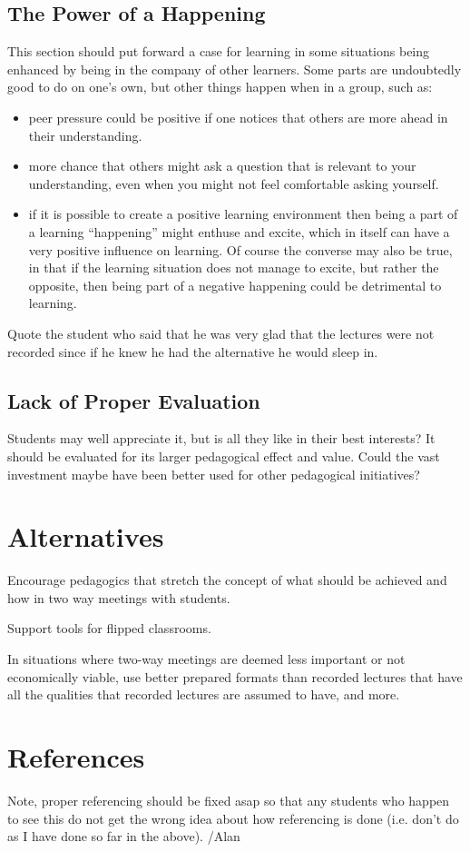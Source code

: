 \documentclass[a4paper,10pt]{article}
\begin{document}
\subsection{The Power of a Happening}
This section should put forward a case for learning in some situations being enhanced by being in the company of other learners. Some parts are undoubtedly good to do on one's own, but other things happen when in a group, such as:
\begin{itemize}
\item  peer pressure could be positive if one notices that others are more ahead in their understanding. 
\item more chance that others might ask a question that is relevant to your understanding, even when you might not feel comfortable asking yourself.
\item if it is possible to create a positive learning environment then being a part of a learning ``happening'' might enthuse and excite, which in itself can have a very positive influence on learning. Of course the converse may also be true, in that if the learning situation does not manage to excite, but rather the opposite, then being part of a negative happening could be detrimental to learning.
\end{itemize}


Quote the student who said that he was very glad that the lectures were not recorded since if he knew he had the alternative he would sleep in. 


\subsection{Lack of Proper Evaluation}
Students may well appreciate it, but is all they like in their best interests? It should be evaluated for its larger pedagogical effect and value.
Could the vast investment maybe have been better used for other pedagogical initiatives?

\section{Alternatives}
Encourage pedagogics that stretch the concept of what should be achieved and how in two way meetings with students.

Support tools for flipped classrooms.

In situations where two-way meetings are deemed less important or not economically viable, use better prepared formats than recorded lectures that have all the qualities that recorded lectures are assumed to have, and more.


\section{References}

Note, proper referencing should be fixed asap so that any students who happen to see this do not get the wrong idea about how referencing is done (i.e. don't do as I have done so far in the above). /Alan
\end{document}
